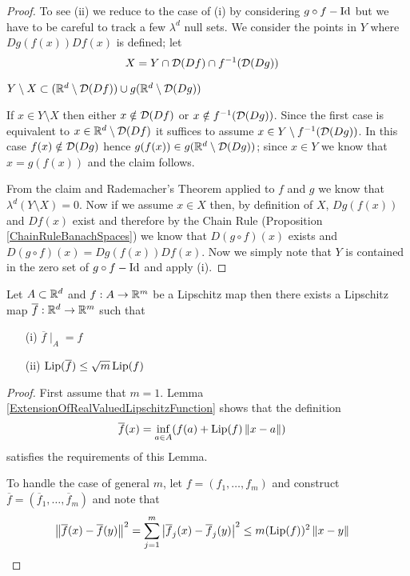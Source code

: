 \begin{proof}
To see (ii) we reduce to the case of (i) by considering $g \circ f - \operatorname*{Id}$ but we have to be careful to track a few $\lambda^d$ null sets.  We consider the points in $Y$ where $Dg(f(x)) Df(x)$ is defined; let
\begin{align*}
X &= Y \cap \mathcal{D}(Df) \cap f^{-1}(\mathcal{D}(Dg))
\end{align*}
\begin{clm}$Y \setminus X \subset (\mathbb{R}^d \setminus \mathcal{D}(Df)) \cup g(\mathbb{R}^d \setminus \mathcal{D}(Dg))$
\end{clm}
If $x \in Y \setminus X$ then either $x \notin \mathcal{D}(Df)$ or $x \notin f^{-1}(\mathcal{D}(Dg))$.  Since the first case is equivalent to $x \in \mathbb{R}^d \setminus \mathcal{D}(Df)$ it suffices to assume 
$x \in Y \setminus f^{-1}(\mathcal{D}(Dg))$.   In this case $f(x) \notin \mathcal{D}(Dg)$ hence $g(f(x)) \in g(\mathbb{R}^d \setminus \mathcal{D}(Dg))$; since $x \in Y$ we know that $x = g(f(x))$ and the claim follows.

From the claim and Rademacher's Theorem applied to $f$ and $g$ we know that $\lambda^d(Y \setminus X) = 0$.  Now if we assume $x \in X$ then, by definition of $X$, $Dg(f(x))$ and $Df(x)$ exist and
therefore by the Chain Rule (Proposition \ref{ChainRuleBanachSpaces}) we know that $D(g \circ f)(x)$ exists and $D(g \circ f)(x) = Dg(f(x)) Df(x)$.  Now we simply note that $Y$ is contained in the zero set of $g \circ f - \operatorname*{Id}$ and apply (i).
\end{proof}

\begin{lem}\label{ExtensionOfLipschitzMaps}Let $A \subset \mathbb{R}^d$ and $f : A \to \mathbb{R}^m$ be a Lipschitz map then there exists a Lipschitz map $\overline{f} : \mathbb{R}^d \to \mathbb{R}^m$ such that
\begin{itemize}
\item[(i)] $\overline{f} \mid_A = f$
\item[(ii)] $\operatorname*{Lip}(\overline{f}) \leq \sqrt{m} \operatorname*{Lip}(f)$
\end{itemize}
\end{lem}
\begin{proof}

First assume that $m=1$.  Lemma
\ref{ExtensionOfRealValuedLipschitzFunction} shows that the definition
\begin{align*}
\overline{f}(x) &= \inf_{a \in A} (f(a) + \operatorname*{Lip}(f) \left \lVert x - a \right \rVert)
\end{align*}
satisfies the requirements of this Lemma.

To handle the case of general $m$, let $f = (f_1, \dotsc, f_m)$ and construct $\overline{f} = (\overline{f}_1, \dotsc, \overline{f}_m)$ and note that
\begin{align*}
\left \lVert \overline{f}(x) - \overline{f}(y) \right \rVert^2 &= \sum_{j=1}^m \left \vert \overline{f}_j(x) - \overline{f}_j(y) \right \vert^2 \leq m (\operatorname*{Lip}(f))^2 \left \lVert x-y \right \rVert
\end{align*}
\end{proof}

